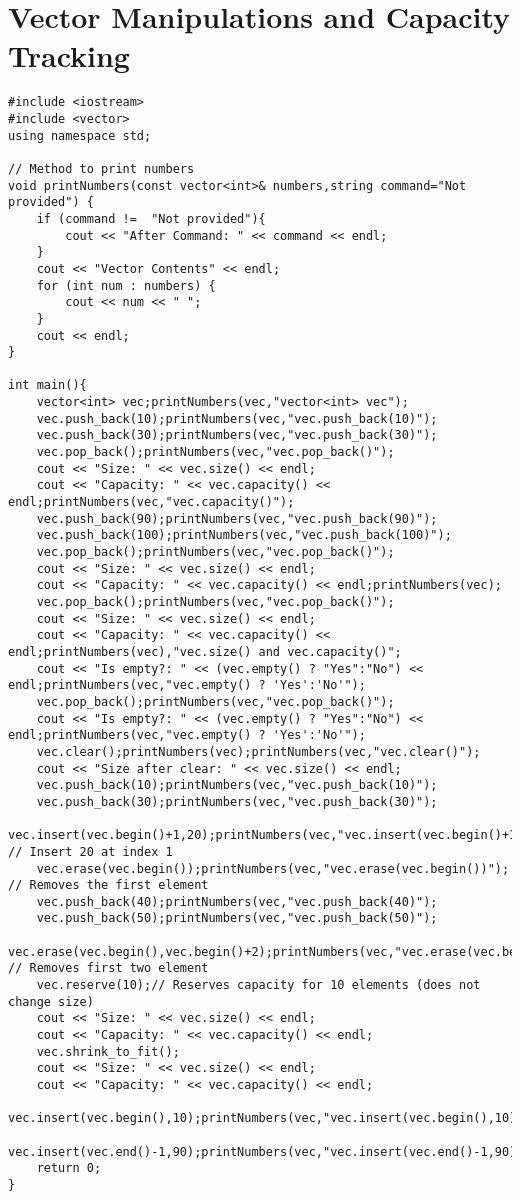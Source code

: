 \documentclass[12pt]{article}
\begin{document}
\section*{Vector Manipulations and Capacity Tracking}
\begin{verbatim}
#include <iostream>
#include <vector>
using namespace std;

// Method to print numbers
void printNumbers(const vector<int>& numbers,string command="Not provided") {
    if (command !=  "Not provided"){
        cout << "After Command: " << command << endl;
    }
    cout << "Vector Contents" << endl;
    for (int num : numbers) {
        cout << num << " ";
    }
    cout << endl;
}

int main(){
    vector<int> vec;printNumbers(vec,"vector<int> vec");
    vec.push_back(10);printNumbers(vec,"vec.push_back(10)");
    vec.push_back(30);printNumbers(vec,"vec.push_back(30)");
    vec.pop_back();printNumbers(vec,"vec.pop_back()");
    cout << "Size: " << vec.size() << endl;
    cout << "Capacity: " << vec.capacity() << endl;printNumbers(vec,"vec.capacity()");
    vec.push_back(90);printNumbers(vec,"vec.push_back(90)");
    vec.push_back(100);printNumbers(vec,"vec.push_back(100)");
    vec.pop_back();printNumbers(vec,"vec.pop_back()");
    cout << "Size: " << vec.size() << endl;
    cout << "Capacity: " << vec.capacity() << endl;printNumbers(vec);
    vec.pop_back();printNumbers(vec,"vec.pop_back()");
    cout << "Size: " << vec.size() << endl;
    cout << "Capacity: " << vec.capacity() << endl;printNumbers(vec),"vec.size() and vec.capacity()";
    cout << "Is empty?: " << (vec.empty() ? "Yes":"No") << endl;printNumbers(vec,"vec.empty() ? 'Yes':'No'");
    vec.pop_back();printNumbers(vec,"vec.pop_back()");
    cout << "Is empty?: " << (vec.empty() ? "Yes":"No") << endl;printNumbers(vec,"vec.empty() ? 'Yes':'No'");
    vec.clear();printNumbers(vec);printNumbers(vec,"vec.clear()");
    cout << "Size after clear: " << vec.size() << endl;
    vec.push_back(10);printNumbers(vec,"vec.push_back(10)");
    vec.push_back(30);printNumbers(vec,"vec.push_back(30)");
    vec.insert(vec.begin()+1,20);printNumbers(vec,"vec.insert(vec.begin()+1,20)"); // Insert 20 at index 1
    vec.erase(vec.begin());printNumbers(vec,"vec.erase(vec.begin())"); // Removes the first element
    vec.push_back(40);printNumbers(vec,"vec.push_back(40)");
    vec.push_back(50);printNumbers(vec,"vec.push_back(50)");
    vec.erase(vec.begin(),vec.begin()+2);printNumbers(vec,"vec.erase(vec.begin(),vec.begin()+2)"); // Removes first two element
    vec.reserve(10);// Reserves capacity for 10 elements (does not change size)
    cout << "Size: " << vec.size() << endl;
    cout << "Capacity: " << vec.capacity() << endl;
    vec.shrink_to_fit();
    cout << "Size: " << vec.size() << endl;
    cout << "Capacity: " << vec.capacity() << endl;
    vec.insert(vec.begin(),10);printNumbers(vec,"vec.insert(vec.begin(),10)");
    vec.insert(vec.end()-1,90);printNumbers(vec,"vec.insert(vec.end()-1,90)");
    return 0;
} 
\end{verbatim}
\end{document}
